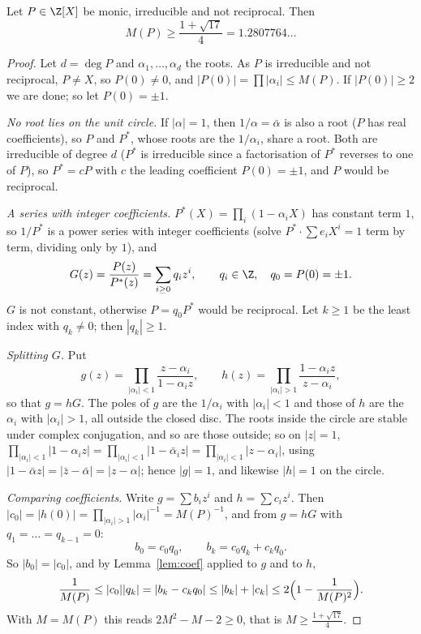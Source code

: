 \begin{theorem}\label{thm:smyth}
Let $P\in\Z[X]$ be monic, irreducible and not reciprocal. Then
\[
M(P)\ge\frac{1+\sqrt{17}}4=1.2807764\ldots
\]
\end{theorem}
\begin{proof}
Let $d=\deg P$ and $\alpha_1,\dots,\alpha_d$ the roots. As $P$ is irreducible and not reciprocal, $P\ne X$, so $P(0)\ne0$, and $|P(0)|=\prod|\alpha_i|\le
M(P)$. If $|P(0)|\ge2$ we are done; so let $P(0)=\pm1$.

\emph{No root lies on the unit circle.} If $|\alpha|=1$, then $1/\alpha=\bar\alpha$ is also a root ($P$ has real coefficients), so $P$ and $P^*$, whose roots are
the $1/\alpha_i$, share a root. Both are irreducible of degree $d$ ($P^*$ is irreducible since a factorisation of $P^*$ reverses to one of $P$), so
$P^*=cP$ with $c$ the leading coefficient $P(0)=\pm1$, and $P$ would be reciprocal.

\emph{A series with integer coefficients.} $P^*(X)=\prod_i(1-\alpha_iX)$ has constant term $1$, so $1/P^*$ is a power series with integer coefficients
(solve $P^*\cdot\sum e_iX^i=1$ term by term, dividing only by $1$), and
\[
G(z)=\frac{P(z)}{P^*(z)}=\sum_{i\ge0}q_iz^i,\qquad q_i\in\Z,\quad q_0=P(0)=\pm1.
\]
$G$ is not constant, otherwise $P=q_0P^*$ would be reciprocal. Let $k\ge1$ be the least index with $q_k\ne0$; then $|q_k|\ge1$.

\emph{Splitting $G$.} Put
\[
g(z)=\prod_{|\alpha_i|<1}\frac{z-\alpha_i}{1-\alpha_iz},\qquad h(z)=\prod_{|\alpha_i|>1}\frac{1-\alpha_iz}{z-\alpha_i},
\]
so that $g=hG$. The poles of $g$ are the $1/\alpha_i$ with $|\alpha_i|<1$ and those of $h$ are the $\alpha_i$ with $|\alpha_i|>1$, all outside the closed
disc. The roots inside the circle are stable under complex conjugation, and so are those outside; so on $|z|=1$,
$\prod_{|\alpha_i|<1}|1-\alpha_iz|=\prod_{|\alpha_i|<1}|1-\bar\alpha_iz|=\prod_{|\alpha_i|<1}|z-\alpha_i|$, using $|1-\bar\alpha z|=|\bar z-\bar\alpha|=
|z-\alpha|$; hence $|g|=1$, and likewise $|h|=1$ on the circle.

\emph{Comparing coefficients.} Write $g=\sum b_iz^i$ and $h=\sum c_iz^i$. Then $|c_0|=|h(0)|=\prod_{|\alpha_i|>1}|\alpha_i|^{-1}=M(P)^{-1}$, and from
$g=hG$ with $q_1=\dots=q_{k-1}=0$:
\[
b_0=c_0q_0,\qquad b_k=c_0q_k+c_kq_0 .
\]
So $|b_0|=|c_0|$, and by Lemma~\ref{lem:coef} applied to $g$ and to $h$,
\[
\frac1{M(P)}\le|c_0||q_k|=|b_k-c_kq_0|\le|b_k|+|c_k|\le2\Bigl(1-\frac1{M(P)^2}\Bigr).
\]
With $M=M(P)$ this reads $2M^2-M-2\ge0$, that is $M\ge\frac{1+\sqrt{17}}4$.
\end{proof}

